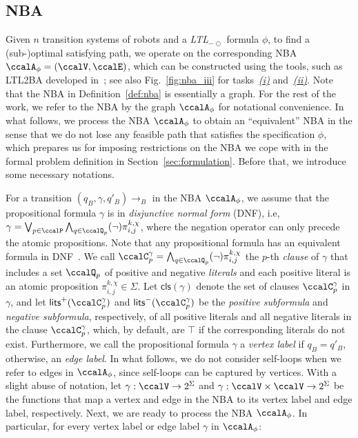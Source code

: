 \documentclass[Afour,sageh,times]{sagej}
\newcommand{\ltl}{ {\it LTL}$_{-\bigcirc}$ }
\newcommand{\autop}{\ccalA_{\phi}}
\renewcommand{\ap}[3]{\mathcal{\pi}_{{#1},{#2}}^{#3}}
\begin{document}
\subsection{NBA}\label{sec:nba}
Given $n$ transition systems of robots and a \ltl formula $\phi$, to find a (sub-)optimal satisfying path, we operate on the corresponding NBA $\autop = (\ccalV, \ccalE)$, which can  be constructed using the tools, such as LTL2BA developed in~\cite{gastin2001fast}; see also Fig.~\ref{fig:nba_iii} for tasks~\hyperref[task:i]{\it (i)} and~\hyperref[task:ii]{\it (ii)}. Note that the NBA in Definition~\ref{def:nba} is essentially a graph. For the rest of the work, we refer to the NBA by the graph $\autop$ for notational convenience. In what follows, we process the NBA $\autop$ to obtain an ``equivalent'' NBA in the sense that we do not lose any feasible path that satisfies the specification $\phi$, which prepares us for imposing restrictions on the NBA we cope with in the formal problem definition in Section~\ref{sec:formulation}. Before that, we introduce some necessary notations.

For a transition $(q_B, \gamma, q'_B)\to_B$ in the NBA $\autop$, we assume that the propositional formula $\gamma$ is  in {\it disjunctive normal form} (DNF), i.e,
$ \gamma = \bigvee_{p\in \ccalP} \bigwedge_{q\in \ccalQ_p} (\neg)\ap{i}{j}{k,\chi}$, where the negation operator can only precede the atomic propositions. Note that any propositional formula has an equivalent formula in DNF~\citep{baier2008principles}. We call  $\ccalC_p^{\gamma}=\bigwedge_{q\in \ccalQ_p}(\neg) \ap{i}{j}{k,\chi}$ the $p$-th {\it clause} of $\gamma$ that includes a set $\ccalQ_p$ of positive and negative {\it literals} and each positive literal is an atomic proposition $\ap{i}{j}{k,\chi}\in \Sigma$. Let $\mathsf{cls}(\gamma)$ denote the set of clauses $\ccalC_p^{\gamma}$ in $\gamma$, and let $\mathsf{lits}^+(\ccalC_p^{\gamma})$ and $\mathsf{lits}^-(\ccalC_p^{\gamma})$ be the {\it positive subformula} and {\it negative  subformula}, respectively,  of all positive literals and all negative literals in the clause $\ccalC_p^\gamma$, which, by default, are $\top$ if the corresponding literals do not exist. Furthermore, we call the propositional formula $\gamma$ a {\it vertex label} if $q_B=q'_B$, otherwise, an {\it edge label}. In what follows, we do not consider self-loops when we refer to edges in $\autop$, since self-loops can be captured by vertices.   With a slight abuse of notation, let {$\gamma: \ccalV \to  2^\Sigma $} and {$\gamma: \ccalV \times \ccalV \to 2^\Sigma$} be the functions that map a vertex and edge in the NBA to its vertex label and edge label, respectively. Next, we are ready to process the NBA $\autop$.  In particular, for every vertex label or edge label $\gamma$ in $\autop$:
\end{document}

